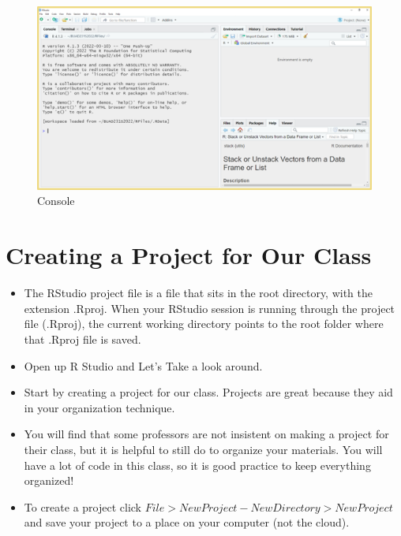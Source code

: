 \documentclass[
  letterpaper,
  DIV=11,
  numbers=noendperiod]{scrreprt}
\providecommand{\tightlist}{%
  \setlength{\itemsep}{0pt}\setlength{\parskip}{0pt}}\usepackage{longtable,booktabs,array}
\begin{document}
\begin{figure}[H]

{\centering \includegraphics{Pictures/Ch0/Console.png}

}

\caption{Console}

\end{figure}%


\chapter{Creating a Project for Our
Class}\label{creating-a-project-for-our-class}

\begin{itemize}
\tightlist
\item
  The RStudio project file is a file that sits in the root directory,
  with the extension .Rproj. When your RStudio session is running
  through the project file (.Rproj), the current working directory
  points to the root folder where that .Rproj file is saved.
\item
  Open up R Studio and Let's Take a look around.
\item
  Start by creating a project for our class. Projects are great because
  they aid in your organization technique.
\item
  You will find that some professors are not insistent on making a
  project for their class, but it is helpful to still do to organize
  your materials. You will have a lot of code in this class, so it is
  good practice to keep everything organized!
\item
  To create a project click
  \(File > New Project - New Directory > New Project\) and save your
  project to a place on your computer (not the cloud).
\end{itemize}
\end{document}
